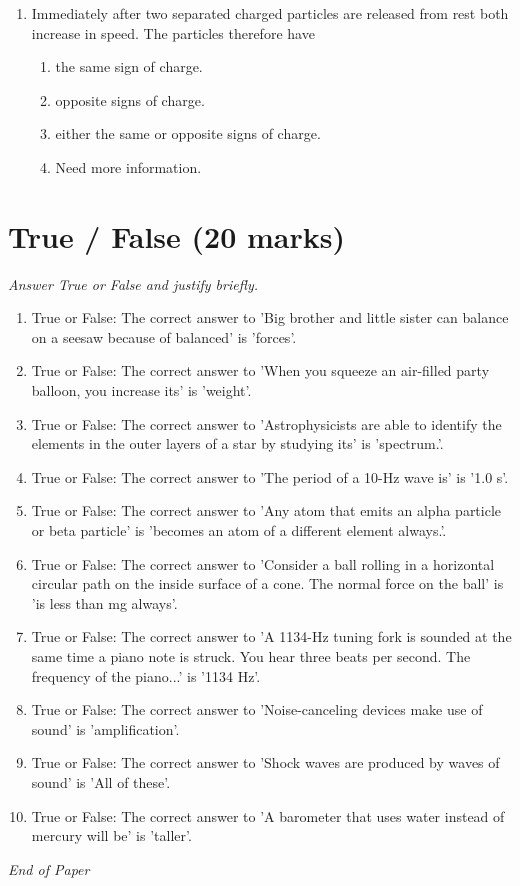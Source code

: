 \documentclass[12pt]{article}
\begin{document}
\begin{enumerate}[label=\arabic*.]
\begin{enumerate}[label=(\alph*)]
\end{enumerate}
\item Immediately after two separated charged particles are released from rest both increase in speed. The particles therefore have
\begin{enumerate}[label=(\alph*)]
    \item the same sign of charge.
    \item opposite signs of charge.
    \item either the same or opposite signs of charge.
    \item Need more information.
\end{enumerate}
\end{enumerate}

\section*{True / False (20 marks)}
\textit{Answer True or False and justify briefly.}
\begin{enumerate}[label=\arabic*.]
\item True or False: The correct answer to 'Big brother and little sister can balance on a seesaw because of balanced' is 'forces'.
\item True or False: The correct answer to 'When you squeeze an air-filled party balloon, you increase its' is 'weight'.
\item True or False: The correct answer to 'Astrophysicists are able to identify the elements in the outer layers of a star by studying its' is 'spectrum.'.
\item True or False: The correct answer to 'The period of a 10-Hz wave is' is '1.0 s'.
\item True or False: The correct answer to 'Any atom that emits an alpha particle or beta particle' is 'becomes an atom of a different element always.'.
\item True or False: The correct answer to 'Consider a ball rolling in a horizontal circular path on the inside surface of a cone. The normal force on the ball' is 'is less than mg always'.
\item True or False: The correct answer to 'A 1134-Hz tuning fork is sounded at the same time a piano note is struck. You hear three beats per second. The frequency of the piano...' is '1134 Hz'.
\item True or False: The correct answer to 'Noise-canceling devices make use of sound' is 'amplification'.
\item True or False: The correct answer to 'Shock waves are produced by waves of sound' is 'All of these'.
\item True or False: The correct answer to 'A barometer that uses water instead of mercury will be' is 'taller'.
\end{enumerate}

\vfill
\noindent\textit{End of Paper}
\end{document}
